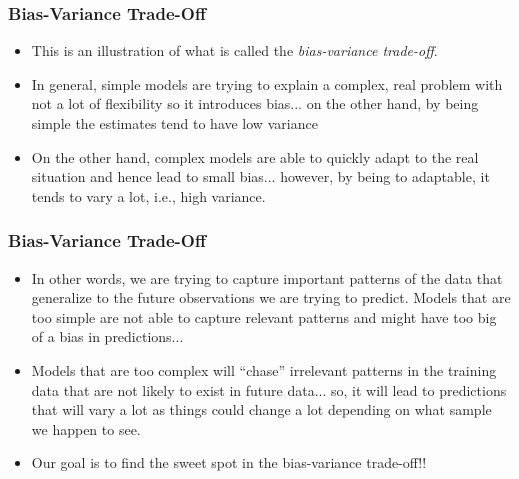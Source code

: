 \documentclass[flegn]{beamer}
\begin{document}
\begin{frame}
\frametitle{Bias-Variance Trade-Off}
\begin{itemize}
\item This is an illustration of what is called the {\color{blue}\it bias-variance trade-off}. 
\item In general, simple models are trying to explain a complex, real problem with not a lot of flexibility so it introduces {\color{blue}bias}...
on the other hand, by being simple the estimates tend to have low {\color{red}variance}
\item On the other hand, complex models are able to quickly adapt to the real situation and hence lead to small {\color{blue}bias}... however, by being to adaptable, it tends to vary a lot, i.e., high {\color{red}variance}.
\end{itemize}
\end{frame}

\begin{frame}
\frametitle{Bias-Variance Trade-Off}
\begin{itemize}
\item In other words, we are trying to capture important patterns of the data that {\color{blue}generalize} to the future observations we are trying to predict. Models that are too simple are not able to capture relevant patterns and might have too big of a bias in predictions...
\item Models that are too complex will ``chase'' irrelevant patterns in the training data that are not likely to exist in future data... so, it will lead to predictions that will vary a lot as things could change a lot depending on what sample we happen to see.
\item {\color{red}Our goal is to find the sweet spot in the bias-variance trade-off!!}
\end{itemize}
\end{frame}
\end{document}
